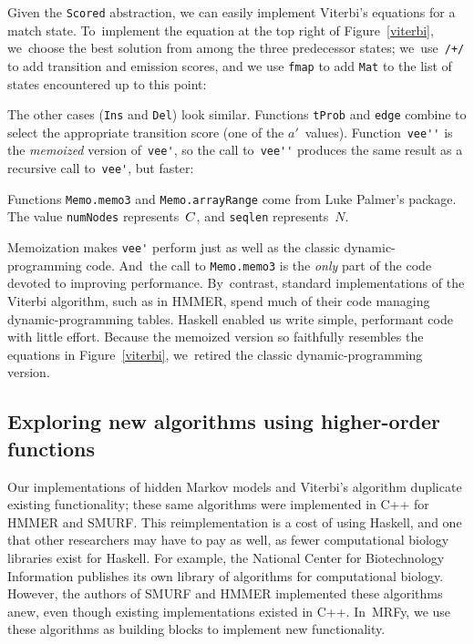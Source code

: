 \documentclass[nonatbib]{sigplanconf}
\newcommand\alignwidth{\ensuremath C} %
\newcommand\figref[1]{Figure~\ref{#1}}
\newcommand\seclabel[1]{\label{sec:#1}}
\newcommand\smallverbatiminput[1]{{\par\unskip\small}}
\begin{document}
Given the \texttt{Scored} abstraction, we can easily implement
Viterbi's equations for a match state.
To~implement the equation at the top right of \figref{viterbi},
we~choose the best solution
from among the three predecessor states;
we~use~\texttt{/+/} to add transition and emission scores,
and we use \texttt{fmap} to add \texttt{Mat} to the list of states
encountered up to this point:
\smallverbatiminput{vfix}
The other cases (\texttt{Ins} and \texttt{Del}) look similar.
Functions \texttt{tProb} and \texttt{edge} combine to select the
appropriate transition score (one of the $a'$~values).
Function~\verb+vee''+ is the \emph{memoized} version of~\verb+vee'+,
so
the call to~\verb+vee''+ produces the same result as a recursive call
to~\verb+vee'+, but faster:
\smallverbatiminput{memo}
Functions \texttt{Memo.memo3} and \texttt{Memo.arrayRange} come from
Luke Palmer's
 package.
The value
\texttt{numNodes} represents~$\alignwidth$,
and \texttt{seqlen} represents~$N$.

Memoization makes \verb+vee'+ perform just as well as the classic
dynamic-programming code.
And~the call to \texttt{Memo.memo3} is the \emph{only} part of the code
devoted to improving performance.
By~contrast, standard implementations of the Viterbi algorithm, such as in HMMER,
spend much of their code 
managing dynamic-programming tables.
Haskell enabled us write simple, performant code with little effort.
%
Because the memoized version so faithfully resembles the equations in
\figref{viterbi}, we~retired the classic dynamic-programming version.





\subsection{Exploring new algorithms using higher-order functions}

\seclabel{hofs}
\seclabel{mrfy}

Our implementations of hidden Markov models and Viterbi's algorithm
duplicate existing functionality; these same algorithms were
implemented in C++ for HMMER and SMURF.
This reimplementation is a cost of using Haskell, and one that
other researchers may have to pay as well, as fewer computational biology
libraries exist for Haskell. For example, the National Center for
Biotechnology Information publishes its own library of algorithms
for computational biology.
However, the authors of SMURF and HMMER implemented these algorithms
anew, even though existing implementations existed in C++.
In~MRFy, we use these algorithms as building blocks to implement
new functionality.
\end{document}
